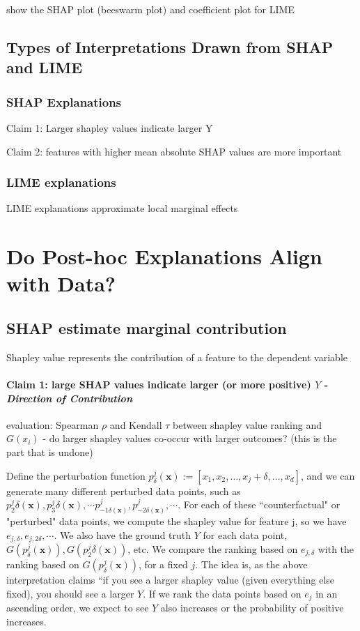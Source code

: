 \documentclass[11pt]{article}
\begin{document}
show the SHAP plot (beeswarm plot) and coefficient plot for LIME
\subsection{Types of Interpretations Drawn from SHAP and LIME}
\subsubsection{SHAP Explanations}
Claim 1: Larger shapley values indicate larger Y

Claim 2: features with higher mean absolute SHAP values are more important

\subsubsection{LIME explanations}
LIME explanations approximate local marginal effects

\section{Do Post-hoc Explanations Align with Data?}
\subsection*{SHAP estimate marginal contribution}
Shapley value represents the contribution of a feature to the dependent variable
\paragraph{Claim 1: large SHAP values indicate larger (or more positive) $Y$ - \emph{Direction of Contribution}}

evaluation:  Spearman $\rho$ and Kendall $\tau$ between shapley value ranking and $G(x_i)$ - do larger shapley values co-occur with larger outcomes? (this is the part that is undone)

    Define the perturbation function $p^j_\delta(\mathbf{x}) := [x_1,x_2,\ldots,x_j+\delta,\ldots,x_d]$, and we can generate many different perturbed data points, such as $p^j_2\delta(\mathbf{x}), p^j_3\delta(\mathbf{x}), \cdots p^j_{-1\delta(\mathbf{x})}, p^j_{-2\delta(\mathbf{x})}, \cdots$.
    For each of these ``counterfactual" or "perturbed" data points, we compute the shapley value for feature j, so we have $e_{j,\delta}, e_{j,2\delta}, \cdots$. We also have the ground truth $Y$ for each data point, $G(p^j_\delta(\mathbf{x})), G(p^j_2\delta(\mathbf{x}))$, etc. We compare the ranking based on $e_{j,\delta}$ with the ranking based on $G(p^j_\delta(\mathbf{x}))$, for a fixed $j$. The idea is, as the above interpretation claims ``if you see a larger shapley value (given everything else fixed), you should see a larger $Y$. If we rank the data points based on $e_{j}$ in an ascending order, we expect to see $Y$ also increases or the probability of positive increases.
    
\end{document}
